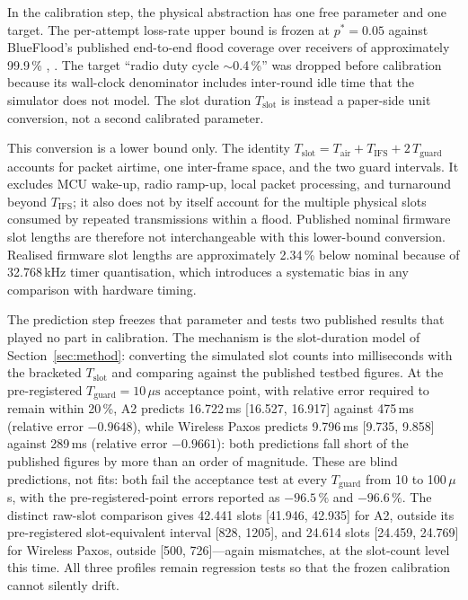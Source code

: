 \documentclass[journal]{IEEEtran}
\newcommand{\Tslot}{T_{\mathrm{slot}}}    %
\begin{document}
In the calibration step, the physical abstraction has one free parameter
and one target. The per-attempt loss-rate upper bound is frozen at
$p^*=0.05$ against BlueFlood's published end-to-end flood coverage over
receivers of approximately 99.9\,\%
\cite{alnahas19blueflood}, \cite{alnahas21blueflood}. The target ``radio duty
cycle $\sim$0.4\,\%'' was dropped before calibration because its wall-clock
denominator includes inter-round idle time that the simulator does not
model. The slot duration $\Tslot$ is instead a paper-side unit conversion,
not a second calibrated parameter.

This conversion is a lower bound only. The identity
$\Tslot = T_{\mathrm{air}} + T_{\mathrm{IFS}} + 2\,T_{\mathrm{guard}}$
accounts for packet airtime, one inter-frame space, and the two guard
intervals. It excludes MCU wake-up, radio ramp-up, local packet processing,
and turnaround beyond $T_{\mathrm{IFS}}$; it also does not by itself account
for the multiple physical slots consumed by repeated transmissions within
a flood. Published
nominal firmware slot lengths are therefore not interchangeable with this
lower-bound conversion. Realised firmware slot lengths are approximately
2.34\,\% below nominal because of 32.768\,kHz timer quantisation, which
introduces a systematic bias in any comparison with hardware timing.

The prediction step freezes that parameter and tests two published results
that played no part in calibration. The mechanism is the slot-duration
model of Section~\ref{sec:method}: converting the simulated slot counts
into milliseconds with the bracketed $\Tslot$ and comparing against the
published testbed figures. At the pre-registered
$T_{\mathrm{guard}}=10\,\mu\mathrm{s}$ acceptance point, with relative
error required to remain within 20\,\%, A2 predicts
16.722\,ms [16.527, 16.917] against 475\,ms (relative error $-0.9648$), while
Wireless Paxos predicts 9.796\,ms [9.735, 9.858] against 289\,ms (relative
error $-0.9661$): both predictions fall short of the published
figures by more than an order of magnitude. These are blind predictions, not
fits: both fail the acceptance test at every $T_{\mathrm{guard}}$
from 10 to 100\,$\mu$s, with
the pre-registered-point errors reported as $-96.5\,\%$ and $-96.6\,\%$.
The distinct raw-slot comparison gives 42.441 slots [41.946, 42.935] for A2,
outside its pre-registered slot-equivalent interval [828, 1205], and 24.614
slots [24.459, 24.769] for Wireless Paxos, outside [500, 726]---again
mismatches, at the slot-count level this time. All three profiles remain
regression tests so that the frozen calibration cannot silently drift.
\end{document}

